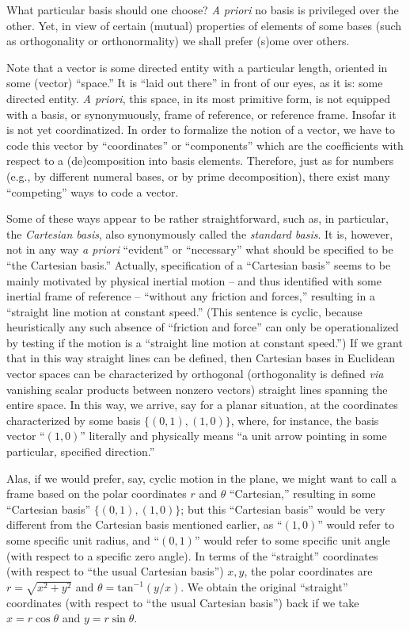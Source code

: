 What particular basis should one choose?
{\em A priori} no basis is privileged over the other.
Yet, in view of certain (mutual) properties of elements of some bases (such as orthogonality or orthonormality)
we shall prefer (s)ome over others.


Note that a vector is some directed entity with a particular length,
oriented in some (vector) ``space.''
It is ``laid out there'' in front of our eyes, as it is: some directed entity.
{\it A priori}, this space, in its most primitive form,
is not equipped with a basis, or synonymuously, frame of reference, or reference frame.
Insofar it is not yet coordinatized.
In order to formalize the notion of a vector, we have to code this vector by ``coordinates''
or ``components'' which are the coefficients with respect to a (de)composition into basis elements.
Therefore, just as for numbers (e.g., by different numeral bases, or by prime decomposition),
there exist many ``competing'' ways to code a vector.

Some of these ways appear to be rather straightforward,
such as, in particular, the {\em Cartesian basis},
also synonymously called the  {\em standard basis}.
It is, however, not in any way {\it a priori}
``evident'' or ``necessary'' what should be specified to be ``the Cartesian basis.''
Actually, specification of a ``Cartesian basis'' seems to be mainly motivated by
physical inertial motion --
and thus identified with some inertial frame of reference --
``without any friction and
forces,'' resulting in a ``straight line motion at constant speed.''
(This sentence is  cyclic, because heuristically any such absence of ``friction and
force''  can only be operationalized by testing if the motion is a
``straight line motion at constant speed.'')
If we grant that in this way straight lines can be defined, then
Cartesian bases in Euclidean vector spaces can be characterized by
orthogonal (orthogonality is defined {\it via} vanishing scalar products between nonzero vectors)
straight lines spanning the entire space.
In this way, we arrive, say for a planar situation, at the coordinates
characterized by some basis $\{(0,1),(1,0)\}$,
where, for instance, the basis vector ``$(1,0)$'' literally and physically
means ``a unit arrow pointing in some particular, specified direction.''

Alas, if we would prefer, say, cyclic motion in the plane,
we might want to call a frame based on the polar coordinates $r$ and $\theta$ ``Cartesian,''
resulting in some ``Cartesian basis'' $\{(0,1),(1,0)\}$;
but this ``Cartesian basis'' would be very different from the Cartesian
basis mentioned earlier,
as ``$(1,0)$'' would refer to some specific unit radius,
and ``$(0,1)$'' would refer to some specific unit angle (with respect to a specific zero angle).
In terms of the ``straight'' coordinates (with respect to ``the usual Cartesian basis'')
$x,y$, the polar coordinates are $r = \sqrt{x^2+y^2}$ and $\theta = \mathrm{tan}^{-1} (y/x)$.
We obtain the original ``straight'' coordinates (with respect to ``the usual Cartesian basis'')
back if we take
$x=r\cos \theta$
and
$y=r\sin \theta$.

